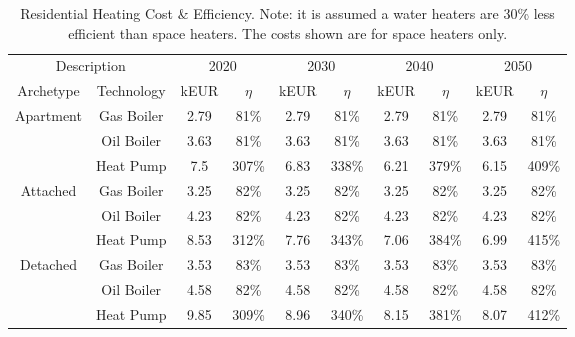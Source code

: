 \documentclass[gmd,manuscript]{copernicus}
\begin{document}
\begin{table}[!htbp]
 \centering
 \footnotesize
 \caption{Residential Heating Cost \& Efficiency. Note: it is assumed a water heaters are 30\% less efficient than space heaters. The costs shown are for space heaters only.}
 \begin{tabular}{cccccccccc}
 \hline
 \multicolumn{2}{c}{Description} & \multicolumn{2}{c}{2020} & \multicolumn{2}{c}{2030} & \multicolumn{2}{c}{2040} & \multicolumn{2}{c}{2050} \\
 
 Archetype & Technology & kEUR & $\eta$ & kEUR & $\eta$ & kEUR & $\eta$ & kEUR & $\eta$ \\
 \hline
 \multirow{3}{*}{Apartment}&Gas Boiler & 2.79 & 81\% & 2.79 & 81\% & 2.79 & 81\% & 2.79 & 81\% \\
 & Oil Boiler & 3.63 & 81\% & 3.63 & 81\% & 3.63 & 81\% & 3.63 & 81\% \\
 & Heat Pump & 7.5 & 307\% & 6.83 & 338\% & 6.21 & 379\% & 6.15 & 409\% \\
 \hline
 \multirow{3}{*}{Attached}&Gas Boiler & 3.25 & 82\% & 3.25 & 82\% & 3.25 & 82\% & 3.25 & 82\% \\
 & Oil Boiler & 4.23 & 82\% & 4.23 & 82\% & 4.23 & 82\% & 4.23 & 82\% \\
 & Heat Pump & 8.53 & 312\% & 7.76 & 343\% & 7.06 & 384\% & 6.99 & 415\% \\
 \hline
 \multirow{3}{*}{Detached}&Gas Boiler & 3.53 & 83\% & 3.53 & 83\% & 3.53 & 83\% & 3.53 & 83\% \\
 & Oil Boiler & 4.58 & 82\% & 4.58 & 82\% & 4.58 & 82\% & 4.58 & 82\% \\
 & Heat Pump & 9.85 & 309\% & 8.96 & 340\% & 8.15 & 381\% & 8.07 & 412\% \\ \hline
 \end{tabular}
 
 \label{Residential Heating Cost & Efficiency}
\end{table}
\end{document}
